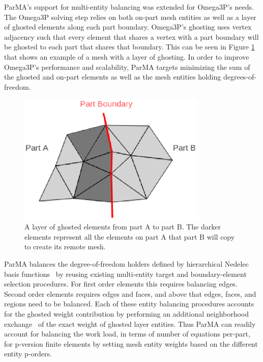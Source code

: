\documentclass[a4paper]{article}
\begin{document}
ParMA's support for multi-entity balancing was extended for Omega3P's needs.
The Omega3P solving step relies on both on-part mesh entities as well as a layer
of ghosted elements along each part boundary.
Omega3P's ghosting uses vertex adjacency such that every element that shares a
vertex with a part boundary will be ghosted to each part that shares that
boundary.
This can be seen in Figure \ref{fig:ghost3} that shows an example of a mesh with
a layer of ghosting.
In order to improve Omega3P's performance and scalability, ParMA targets
minimizing the sum of the ghosted and on-part elements as well as the mesh
entities holding degrees-of-freedom.

\begin{figure}[ht]
\centering
\includegraphics[width=0.8\textwidth]{ghost.eps} 
\caption{\label{fig:ghost3} A layer of ghosted elements from part A to part B. The darker elements represent all the elements on part A that part B will copy to create its remote mesh.}
\end{figure}

ParMA balances the degree-of-freedom holders defined by 
hierarchical Nedelec basis functions~\cite{ko2010advances,ingelstrom2006new} by
reusing existing multi-entity target and boundary-element selection
procedures.
For first order elements this requires balancing edges.
Second order elements requires edges and faces, and above that edges, faces, and
regions need to be balanced.
Each of these entity balancing procedures accounts for the ghosted weight
contribution by performing an additional neighborhood
exchange~\cite{ibanez2014hybrid} of the exact weight of ghosted layer entities.
Thus ParMA can readily account for balancing the work load, in terms of number
of equations per-part, for p-version finite elements by setting mesh entity
weights based on the different entity p-orders.
\end{document}
